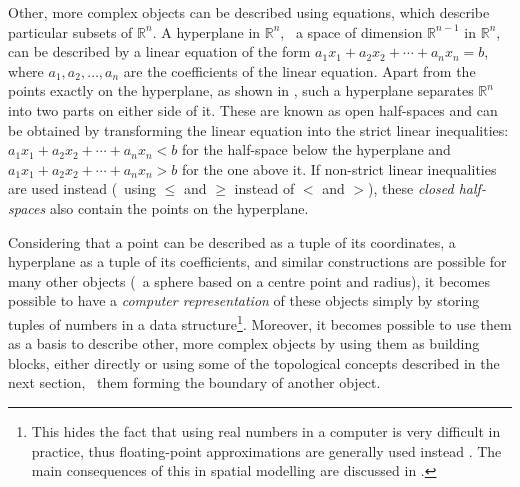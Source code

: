Other, more complex objects can be described using equations, which describe particular subsets of $\mathbb{R}^n$.
A hyperplane in $\mathbb{R}^n$, \ie\ a space of dimension $\mathbb{R}^{n-1}$ in $\mathbb{R}^n$, can be described by a linear equation of the form $a_1 x_1 + a_2 x_2 + \cdots + a_n x_n = b$, where $a_1, a_2, \ldots, a_n$ are the coefficients of the linear equation.
Apart from the points exactly on the hyperplane, as shown in , such a hyperplane separates $\mathbb{R}^n$ into two parts on either side of it.
These are known as open half-spaces and can be obtained by transforming the linear equation into the strict linear inequalities: $a_1 x_1 + a_2 x_2 + \cdots + a_n x_n < b$ for the half-space below the hyperplane and $a_1 x_1 + a_2 x_2 + \cdots + a_n x_n > b$ for the one above it.
If non-strict linear inequalities are used instead (\ie\ using $\leq$ and $\geq$ instead of $<$ and $>$), these \emph{closed half-spaces} also contain the points on the hyperplane.

Considering that a point can be described as a tuple of its coordinates, a hyperplane as a tuple of its coefficients, and similar constructions are possible for many other objects (\eg\ a sphere based on a centre point and radius), it becomes possible to have a \emph{computer representation} of these objects simply by storing tuples of numbers in a data structure\footnote{This hides the fact that using real numbers in a computer is very difficult in practice, thus floating-point approximations are generally used instead \citep{Goldberg91}.
The main consequences of this in spatial modelling are discussed in .}.
Moreover, it becomes possible to use them as a basis to describe other, more complex objects by using them as building blocks, either directly or using some of the topological concepts described in the next section, \eg\ them forming the boundary of another object.

